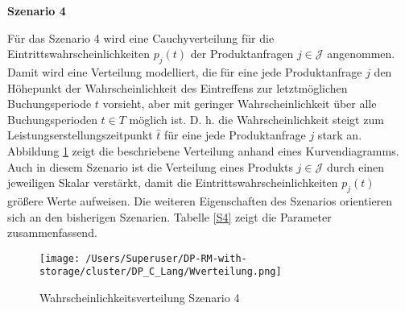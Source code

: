 \newpage

\textbf{Szenario 4}

Für das Szenario 4 wird eine Cauchyverteilung für die Eintrittswahrscheinlichkeiten $p_j(t)$ der Produktanfragen $j\in\mathcal{J}$ angenommen. Damit wird eine Verteilung modelliert, die für eine jede Produktanfrage $j$ den Höhepunkt der Wahrscheinlichkeit des Eintreffens zur letztmöglichen Buchungsperiode $t$ vorsieht, aber mit geringer Wahrscheinlichkeit über alle Buchungsperioden $t\in T$ möglich ist. D. h. die Wahrscheinlichkeit steigt zum Leistungserstellungszeitpunkt $\hat t$ für eine jede Produktanfrage $j$ stark an. Abbildung \ref{SB4} zeigt die beschriebene Verteilung anhand eines Kurvendiagramms. Auch in diesem Szenario ist die Verteilung eines Produkts $j\in\mathcal{J}$ durch einen jeweiligen Skalar verstärkt, damit die Eintrittswahrscheinlichkeiten $p_j(t)$ größere Werte aufweisen. Die weiteren Eigenschaften des Szenarios orientieren sich an den bisherigen Szenarien. Tabelle \ref{S4} zeigt die Parameter zusammenfassend.

\begin{figure}[h!]
  \begin{center}
    \texttt{[image: /Users/Superuser/DP-RM-with-storage/cluster/DP\_C\_Lang/Wverteilung.png]}
    \caption{Wahrscheinlichkeitsverteilung Szenario 4}  \label{SB4}
  \end{center}
\end{figure}

